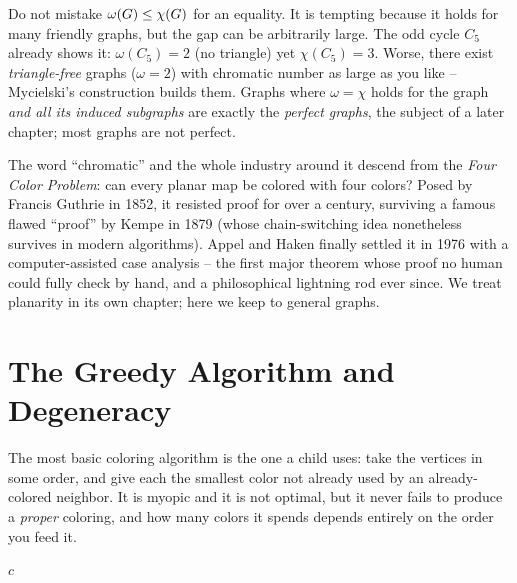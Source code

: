 \begin{trapbox}
Do not mistake $\omega(G)\le\chi(G)$ for an equality. It is tempting because
it holds for many friendly graphs, but the gap can be arbitrarily large. The odd
cycle $C_5$ already shows it: $\omega(C_5)=2$ (no triangle) yet $\chi(C_5)=3$.
Worse, there exist \emph{triangle-free} graphs ($\omega=2$) with chromatic number
as large as you like -- Mycielski's construction builds them. Graphs where
$\omega=\chi$ holds for the graph \emph{and all its induced subgraphs} are exactly
the \emph{perfect graphs}, the subject of a later chapter; most graphs are not
perfect.
\end{trapbox}

\begin{historybox}
The word ``chromatic'' and the whole industry around it descend from the
\emph{Four Color Problem}: can every planar map be colored with four colors? Posed
by Francis Guthrie in 1852, it resisted proof for over a century, surviving a
famous flawed ``proof'' by Kempe in 1879 (whose chain-switching idea nonetheless
survives in modern algorithms). Appel and Haken finally settled it in 1976 with a
computer-assisted case analysis -- the first major theorem whose proof no human
could fully check by hand, and a philosophical lightning rod ever since. We treat
planarity in its own chapter; here we keep to general graphs.
\end{historybox}

\section{The Greedy Algorithm and Degeneracy}
\label{ch28:greedy}

The most basic coloring algorithm is the one a child uses: take the vertices in
some order, and give each the smallest color not already used by an
already-colored neighbor. It is myopic and it is not optimal, but it never fails to
produce a \emph{proper} coloring, and how many colors it spends depends entirely on
the order you feed it.

\begin{algorithm}[H]
\caption{\textsc{GreedyColor}$(\Gph, \pi)$ -- greedy coloring in a fixed order}
\label{ch28:alg-greedy}
\Return $c$\;
\end{algorithm}

